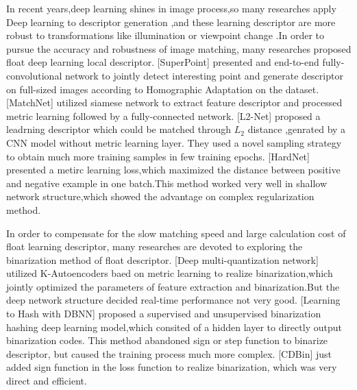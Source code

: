 \documentclass{svproc}
\begin{document}
In recent years,deep learning shines in image process,so many researches apply Deep learning to descriptor generation ,and these learning descriptor are more robust to transformations like illumination or viewpoint change .In order to pursue the accuracy and robustness of image matching, many researches proposed float deep learning local descriptor.
[SuperPoint]\cite{c12} presented and end-to-end fully-convolutional network to jointly detect interesting point and  generate descriptor on full-sized images according to Homographic Adaptation on the dataset.
[MatchNet]\cite{c13} utilized  siamese network to extract feature descriptor and processed metric learning followed by a fully-connected network.
[L2-Net]\cite{c14} proposed a leadrning descriptor which could be matched through $L_{2}$ distance ,genrated by a CNN model without metric learning layer. They used a novel sampling strategy to obtain much more training samples in few training epochs.
[HardNet] \cite{c15} presented a metirc learning loss,which maximized the distance between positive and negative example in one batch.This method worked very well in shallow network structure,which showed the advantage on complex regularization method.

In order to compensate for the slow matching speed and large calculation cost of float learning descriptor, many researches are devoted to exploring the binarization method of float descriptor.
	[Deep  multi-quantization network]\cite{c16} utilized K-Autoencoders baed on metric learning to realize binarization,which jointly optimized the parameters of feature extraction and  binarization.But the deep network structure  decided  real-time performance not very good. 
[Learning to Hash  with DBNN]\cite{c17} proposed a supervised and unsupervised binarization hashing deep learning model,which consited of a hidden layer to directly output binarization codes. This method abandoned sign or step function to binarize descriptor, but caused the training process much more complex. 
[CDBin]\cite{c18} just added sign function in the loss function to realize binarization, which was very direct and efficient.
\end{document}
